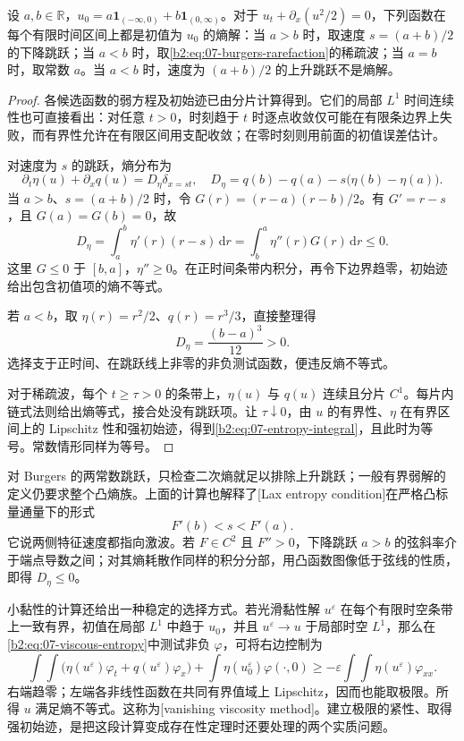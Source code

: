 \begin{theorem}\label{b2:thm:07-burgers-riemann}
设 \(a,b\in\mathbb R\)，\(u_0=a\mathbf1_{(-\infty,0)}+b\mathbf1_{(0,\infty)}\)。对于
\(u_t+\partial_x(u^2/2)=0\)，下列函数在每个有限时间区间上都是初值为 \(u_0\) 的熵解：当 \(a>b\) 时，取速度 \(s=(a+b)/2\) 的下降跳跃；当 \(a<b\) 时，取\eqref{b2:eq:07-burgers-rarefaction}的稀疏波；当 \(a=b\) 时，取常数 \(a\)。当 \(a<b\) 时，速度为 \((a+b)/2\) 的上升跳跃不是熵解。
\end{theorem}
\begin{proof}
各候选函数的弱方程及初始迹已由分片计算得到。它们的局部 \(L^1\) 时间连续性也可直接看出：对任意 \(t>0\)，时刻趋于 \(t\) 时逐点收敛仅可能在有限条边界上失败，而有界性允许在有限区间用支配收敛；在零时刻则用前面的初值误差估计。

对速度为 \(s\) 的跳跃，熵分布为
\[
 \partial_t\eta(u)+\partial_xq(u)
 =D_\eta\delta_{x=st},
 \quad D_\eta=q(b)-q(a)-s\bigl(\eta(b)-\eta(a)\bigr).
\]
当 \(a>b\)、\(s=(a+b)/2\) 时，令
\(G(r)=(r-a)(r-b)/2\)。有 \(G'=r-s\)，且 \(G(a)=G(b)=0\)，故
\[
 D_\eta=\int_a^b\eta'(r)(r-s)\,\mathrm dr
       =\int_b^a\eta''(r)G(r)\,\mathrm dr\leq0.
\]
这里 \(G\leq0\) 于 \([b,a]\)，\(\eta''\geq0\)。在正时间条带内积分，再令下边界趋零，初始迹给出包含初值项的熵不等式。

若 \(a<b\)，取 \(\eta(r)=r^2/2\)、\(q(r)=r^3/3\)，直接整理得
\begin{equation}\label{b2:eq:07-burgers-quadratic-dissipation}
 D_\eta=\frac{(b-a)^3}{12}>0.
\end{equation}
选择支于正时间、在跳跃线上非零的非负测试函数，便违反熵不等式。

对于稀疏波，每个 \(t\geq\tau>0\) 的条带上，\(\eta(u)\) 与 \(q(u)\) 连续且分片 \(C^1\)。每片内链式法则给出熵等式，接合处没有跳跃项。让 \(\tau\downarrow0\)，由 \(u\) 的有界性、\(\eta\) 在有界区间上的 Lipschitz 性和强初始迹，得到\eqref{b2:eq:07-entropy-integral}，且此时为等号。常数情形同样为等号。
\end{proof}

对 Burgers 的两常数跳跃，只检查二次熵就足以排除上升跳跃；一般有界弱解的定义仍要求整个凸熵族。上面的计算也解释了[Lax entropy condition]在严格凸标量通量下的形式
\[
 F'(b)<s<F'(a).
\]
它说两侧特征速度都指向激波。若 \(F\in C^2\) 且 \(F''>0\)，下降跳跃 \(a>b\) 的弦斜率介于端点导数之间；对其熵耗散作同样的积分分部，用凸函数图像低于弦线的性质，即得 \(D_\eta\leq0\)。

小黏性的计算还给出一种稳定的选择方式。若光滑黏性解 \(u^\varepsilon\) 在每个有限时空条带上一致有界，初值在局部 \(L^1\) 中趋于 \(u_0\)，并且 \(u^\varepsilon\to u\) 于局部时空 \(L^1\)，那么在\eqref{b2:eq:07-viscous-entropy}中测试非负 \(\varphi\)，可将右边控制为
\[
 \int\!\!\int
 \bigl(\eta(u^\varepsilon)\varphi_t+q(u^\varepsilon)\varphi_x\bigr)
 +\int\eta(u_0^\varepsilon)\varphi(\cdot,0)
 \geq-\varepsilon\int\!\!\int\eta(u^\varepsilon)\varphi_{xx}.
\]
右端趋零；左端各非线性函数在共同有界值域上 Lipschitz，因而也能取极限。所得 \(u\) 满足熵不等式。这称为[vanishing viscosity method]。建立极限的紧性、取得强初始迹，是把这段计算变成存在性定理时还要处理的两个实质问题。

